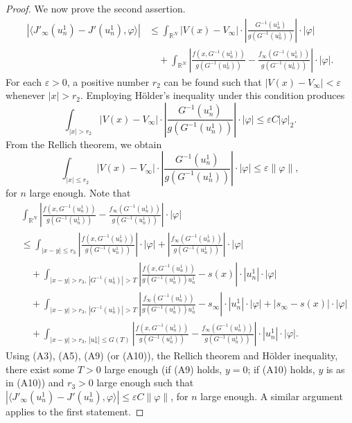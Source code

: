 \documentclass[reqno]{amsart}
\begin{document}
\begin{proof}
We now prove the second assertion.
 \begin{align*}
|\langle J'_\infty(u^1_n)-J'(u^1_n),\varphi\rangle|
&\leq \int_{\mathbb{R}^N}|V(x)-V_\infty|\cdot |\frac{G^{-1}(u^1_n)}{g(G^{-1}(u^1_n))}|\cdot |\varphi|\\
&\quad +\int_{\mathbb{R}^N}|\frac{f(x,G^{-1}(u^1_n))}{g(G^{-1}(u^1_n))}-\frac{f_\infty(G^{-1}(u^1_n))}{g(G^{-1}(u^1_n))}|\cdot |\varphi|.
 \end{align*}
For each \(\varepsilon > 0\), a positive number \(r_2\) can be found such that 
\(|V(x) - V_\infty| < \varepsilon\) whenever \(|x| > r_2\). Employing H\"older's inequality under 
this condition produces 
$$
\int_{|x|>r_2}|V(x)-V_\infty|\cdot |\frac{G^{-1}(u^1_n)}{g(G^{-1}(u^1_n))}|\cdot |\varphi|\leq\varepsilon C|\varphi|_2.
$$
From the Rellich theorem, we obtain
$$
\int_{|x|\leq r_2}|V(x)-V_\infty|\cdot |\frac{G^{-1}(u^1_n)}{g(G^{-1}(u^1_n))}|\cdot |\varphi|\leq\varepsilon \|\varphi\|,
$$ 
for $n$ large enough.
Note that 
\begin{align*}
&\int_{\mathbb{R}^N}|\frac{f(x,G^{-1}(u^1_n))}{g(G^{-1}(u^1_n))}
 -\frac{f_\infty(G^{-1}(u^1_n))}{g(G^{-1}(u^1_n))}|\cdot |\varphi|\\
&\leq\int_{|x-y|\leq r_3}|\frac{f(x,G^{-1}(u^1_n))}{g(G^{-1}(u^1_n))}|\cdot
  |\varphi|+|\frac{f_\infty(G^{-1}(u^1_n))}{g(G^{-1}(u^1_n))}|\cdot |\varphi|\\
&\quad+\int_{|x-y|>r_3,\,|G^{-1}(u^1_n)|>T}|\frac{f(x,G^{-1}(u^1_n))}{g(G^{-1}(u^1_n))u^1_n}-s(x)|\cdot |u^1_n|\cdot |\varphi|\\
&\quad+\int_{|x-y|>r_3,\,|G^{-1}(u^1_n)|>T}|\frac{f_\infty(G^{-1}(u^1_n))}{g(G^{-1}(u^1_n))u^1_n}-s_\infty|\cdot |u^1_n|\cdot |\varphi|+|s_\infty-s(x)|\cdot |\varphi|\\
&\quad+\int_{|x-y|>r_3,\,|u^1_n|\leq G(T)}|\frac{f(x,G^{-1}(u^1_n))}{g(G^{-1}(u^1_n))}-\frac{f_\infty(G^{-1}(u^1_n))}{g(G^{-1}(u^1_n))}|\cdot |u^1_n|\cdot |\varphi|.
\end{align*}
Using (A3), (A5), (A9) (or (A10)), the Rellich theorem and H\"older inequality, there exist  some $T>0$ large enough (if (A9) holds, $y=0$; if (A10) holds, $y$ is as in (A10)) and $r_3>0$ large enough such that $|\langle J'_\infty(u^1_n)-J'(u^1_n),\varphi\rangle|\leq\varepsilon C \|\varphi\|$, 
for $n$ large enough. A similar argument applies to the first statement.


\end{proof}
\end{document}
